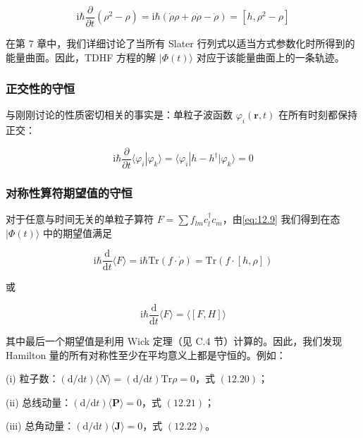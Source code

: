 \begin{equation}
\mathrm{i}\hbar\frac{\partial}{\partial t}(\rho^{2}-\rho)=\mathrm{i}\hbar(\dot{\rho}\rho+\rho\dot{\rho}-\dot{\rho})=[h,\rho^{2}-\rho]\label{eq:12.17}
\end{equation}

在第 7 章中，我们详细讨论了当所有 Slater 行列式以适当方式参数化时所得到的能量曲面。因此，TDHF 方程的解 $|\Phi(t)\rangle$
对应于该能量曲面上的一条轨迹。

\subsubsection{正交性的守恒\label{subsubsec:12.2.2.2}}

与刚刚讨论的性质密切相关的事实是：单粒子波函数 $\varphi_{i}(\boldsymbol{r},t)$ 在所有时刻都保持正交：

\begin{equation}
\mathrm{i}\hbar\frac{\partial}{\partial t}\langle\varphi_{i}|\varphi_{k}\rangle=\langle\varphi_{i}|h-h^{\dagger}|\varphi_{k}\rangle=0\label{eq:12.18}
\end{equation}


\subsubsection{对称性算符期望值的守恒\label{subsubsec:12.2.2.3}}

对于任意与时间无关的单粒子算符 $F=\sum f_{lm}c^{\dagger}_{l}c_{m}$，由\ref{eq:12.9}
我们得到在态 $|\Phi(t)\rangle$ 中的期望值满足

\[
\mathrm{i}\hbar\frac{\mathrm{d}}{\mathrm{d}t}\langle F\rangle=\mathrm{i}\hbar\mathrm{Tr}(f\cdot\dot{\rho})=\mathrm{Tr}(f\cdot[h,\rho])
\]

或

\begin{equation}
\mathrm{i}\hbar\frac{\mathrm{d}}{\mathrm{d}t}\langle F\rangle=\langle[F,H]\rangle\label{eq:12.19}
\end{equation}

其中最后一个期望值是利用 Wick 定理（见 C.4 节）计算的。因此，我们发现 Hamilton 量的所有对称性至少在平均意义上都是守恒的。例如：

(i) 粒子数：$(\mathrm{d}/\mathrm{d}t)\langle N\rangle=(\mathrm{d}/\mathrm{d}t)\mathrm{Tr}\rho=0$，式
$(12.20)$；

(ii) 总线动量：$(\mathrm{d}/\mathrm{d}t)\langle\boldsymbol{P}\rangle=0$，式
$(12.21)$；

(iii) 总角动量：$(\mathrm{d}/\mathrm{d}t)\langle\boldsymbol{J}\rangle=0$，式
$(12.22)$。

